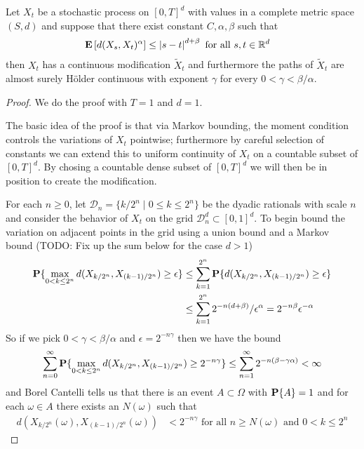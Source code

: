 \begin{thm}Let $X_t$ be a stochastic process on
  $[0,T]^d$ with values in a complete metric space $(S,d)$ and suppose
  that there exist constant $C, \alpha, \beta$ such that 
\begin{align*}
\textbf{E}\left[d(X_s, X_t)^\alpha\right] &\leq \left \vert s-t \right \vert^{d + \beta} \text{
  for all $s,t \in \mathbb{R}^d$}
\end{align*}
then $X_t$ has a continuous modification $\tilde{X}_t$ and furthermore
the paths of $\tilde{X}_t$ are almost surely H\"older continuous with
exponent $\gamma$ for every $0 < \gamma < \beta/\alpha$.
\end{thm}
\begin{proof}
We do the proof with $T=1$ and $d=1$.  

The basic idea of the proof is that via Markov bounding, the moment
condition controls the variations of $X_t$ pointwise; furthermore by careful
selection of constants we can extend this to uniform continuity of $X_t$ on a
countable subset of $[0,T]^d$.  By chosing a countable dense subset of
$[0,T]^d$ we will then be in position to create the modification.

For each $n \geq 0$, let $\mathcal{D}_n = \lbrace k/2^n \mid 0 \leq k
\leq 2^n \rbrace$ be the dyadic rationals with scale $n$ and consider
the behavior of $X_t$ on the grid $\mathcal{D}_n^d \subset [0,1]^d$.
To begin bound the variation on adjacent points in the grid using a
union bound and a Markov bound (TODO: Fix up the sum below for the
case $d>1$)
\begin{align*}
\textbf{P}\{\max_{0 < k \leq 2^n} d(X_{k/2^n}, X_{(k-1)/2^n}) \geq  \epsilon\}
&\leq \sum_{k=1}^{2^n} \textbf{P}\{d(X_{k/2^n}, X_{(k-1)/2^n}) \geq \epsilon\} \\
&\leq \sum_{k=1}^{2^n} 2^{-n(d+\beta)}/\epsilon^\alpha = 2^{-n\beta} \epsilon^{-\alpha}
\end{align*}
So if we pick $0 < \gamma < \beta/\alpha$ and $\epsilon=2^{-n\gamma}$
then we have the bound 
\begin{align*}
\sum_{n=0}^\infty \textbf{P}\{\max_{0 < k \leq 2^n} d(X_{k/2^n}, X_{(k-1)/2^n}) \geq
  2^{-n\gamma}\} \leq \sum_{n=1}^\infty  2^{-n(\beta - \gamma\alpha)} < \infty
\end{align*}
and Borel Cantelli tells us that there is an event $A \subset \Omega$
with $\textbf{P}\{A\}=1$ and for each $\omega \in A$ there exists an
$N(\omega)$ such that 
\begin{align*}
d(X_{k/2^n}(\omega),
X_{(k-1)/2^n}(\omega)) &< 2^{-n\gamma} \text{ for all $n \geq
  N(\omega)$ and $0 < k \leq 2^n$}
\end{align*}


\end{proof}
